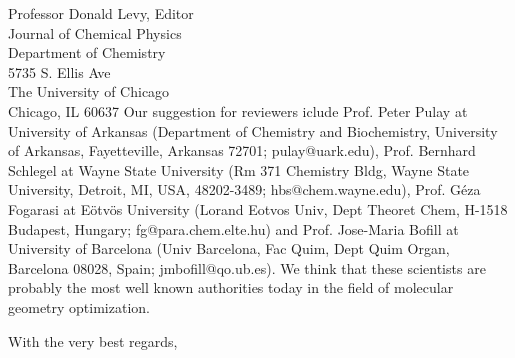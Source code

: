 \begin{letter}{
Professor Donald Levy, Editor\\
Journal of Chemical Physics\\
Department of Chemistry\\
5735 S. Ellis Ave\\
The University of Chicago\\
Chicago, IL 60637}
Our suggestion for reviewers iclude
Prof. Peter Pulay at University of Arkansas (Department of Chemistry and Biochemistry, University of Arkansas, Fayetteville, Arkansas 72701; pulay@uark.edu),  
Prof. Bernhard Schlegel at Wayne State University (Rm 371 Chemistry 
Bldg, Wayne State University, Detroit, MI, USA, 48202-3489; 
\newline
hbs@chem.wayne.edu), 
Prof. G{\'e}za Fogarasi at E{\"o}tv{\"o}s University (Lorand Eotvos Univ, Dept Theoret Chem, H-1518 Budapest, Hungary; fg@para.chem.elte.hu) and 
Prof. Jose-Maria Bofill at University of \newline Barcelona (Univ Barcelona, Fac Quim, Dept Quim Organ, 
Barcelona 08028, Spain; jmbofill@qo.ub.es).
We think that these scientists are probably the most well known
authorities today in the field of molecular geometry optimization.

\closing{With the very best regards,}
\end{letter}


